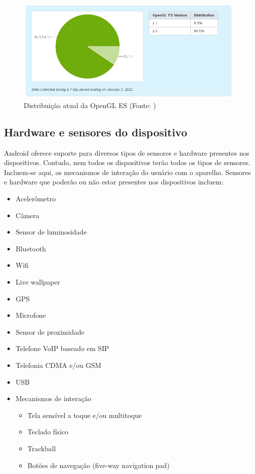\begin{figure}[h]
    \centering
    \includegraphics[width=15cm]{img/opengl}
    \caption[Distribuição atual da OpenGL ES]{Distribuição atual da OpenGL ES (Fonte: \cite{opengl_versions})}
    \label{distribuicao_opengl}
\end{figure}


\subsection{Hardware e sensores do dispositivo}

Android oferece suporte para diversos tipos de sensores e hardware presentes nos 
dispositivos. Contudo, nem todos os dispositivos terão todos os tipos de sensores.
Incluem-se aqui, os mecanismos de interação do usuário com o aparelho.
Sensores e hardware que poderão ou não estar presentes nos dispositivos incluem:
\begin{itemize}
    \item Acelerômetro
    \item Câmera
    \item Sensor de luminosidade
    \item Bluetooth
    \item Wifi
    \item Live wallpaper
    \item GPS
    \item Microfone
    \item Sensor de proximidade
    \item Telefone VoIP baseado em SIP
    \item Telefonia CDMA e/ou GSM
    \item USB
    \item Mecanismos de interação
    \begin{itemize}
        \item Tela sensível a toque e/ou multitoque
        \item Teclado físico
        \item Trackball
        \item Botões de navegação (five-way navigation pad)
    \end{itemize}
\end{itemize}


